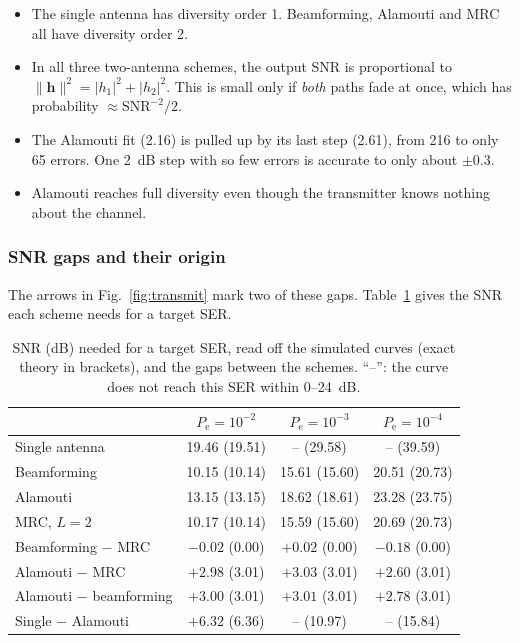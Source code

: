 \documentclass[11pt,a4paper]{article}
\newcommand{\snr}{\mathrm{SNR}}
\newcommand{\norm}[1]{\lVert #1 \rVert}
\newcommand{\abs}[1]{\lvert #1 \rvert}
\newcommand{\Pe}{P_{\mathrm{e}}}
\newcommand{\h}{\mathbf{h}}
\begin{document}
\begin{itemize}
  \item The single antenna has diversity order 1. Beamforming, Alamouti and MRC all
        have diversity order 2.
  \item In all three two-antenna schemes, the output SNR is proportional to
        $\norm{\h}^2 = \abs{h_1}^2 + \abs{h_2}^2$. This is small only if \emph{both}
        paths fade at once, which has probability $\approx \snr^{-2}/2$.
  \item The Alamouti fit (2.16) is pulled up by its last step (2.61), from 216 to only
        65 errors. One 2~dB step with so few errors is accurate to only about
        $\pm0.3$.
  \item Alamouti reaches full diversity even though the transmitter knows nothing
        about the channel.
\end{itemize}

\subsubsection{SNR gaps and their origin}
\label{sec:p3-gaps}

The arrows in Fig.~\ref{fig:transmit} mark two of these gaps.
Table~\ref{tab:p3-gaps} gives the SNR each scheme needs for a target SER.

\begin{table}[htbp]
  \centering\small
  \caption{SNR (dB) needed for a target SER, read off the simulated curves (exact
           theory in brackets), and the gaps between the schemes. ``--'': the curve
           does not reach this SER within 0--24~dB.}
  \label{tab:p3-gaps}
  \begin{tabular}{@{}lccc@{}}
    \toprule
    & $\Pe = 10^{-2}$ & $\Pe = 10^{-3}$ & $\Pe = 10^{-4}$ \\
    \midrule
    Single antenna & 19.46 (19.51) & -- (29.58)    & -- (39.59) \\
    Beamforming    & 10.15 (10.14) & 15.61 (15.60) & 20.51 (20.73) \\
    Alamouti       & 13.15 (13.15) & 18.62 (18.61) & 23.28 (23.75) \\
    MRC, $L = 2$   & 10.17 (10.14) & 15.59 (15.60) & 20.69 (20.73) \\
    \midrule
    Beamforming $-$ MRC      & $-0.02$ (0.00) & $+0.02$ (0.00) & $-0.18$ (0.00) \\
    Alamouti $-$ MRC         & $+2.98$ (3.01) & $+3.03$ (3.01) & $+2.60$ (3.01) \\
    Alamouti $-$ beamforming & $+3.00$ (3.01) & $+3.01$ (3.01) & $+2.78$ (3.01) \\
    Single $-$ Alamouti      & $+6.32$ (6.36) & -- (10.97)     & -- (15.84) \\
    \bottomrule
  \end{tabular}
\end{table}
\end{document}
